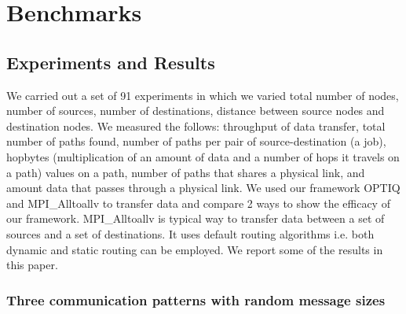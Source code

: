 \section{Benchmarks}
\label{sec:benchmark}







\subsection{Experiments and Results}

We carried out a set of 91 experiments in which we varied total number of nodes, number of sources, number of destinations, distance between source nodes and destination nodes. We measured the follows: throughput of data transfer, total number of paths found, number of paths per pair of source-destination (a job), hopbytes (multiplication of an amount of data and a number of hops it travels on a path) values on a path, number of paths that shares a physical link, and amount data that passes through a physical link. We used our framework OPTIQ and MPI\_Alltoallv to transfer data and compare 2 ways to show the efficacy of our framework. MPI\_Alltoallv is typical way to transfer data between a set of sources and a set of destinations. It uses default routing algorithms i.e. both dynamic and static routing can be employed. We report some of the results in this paper.



\subsubsection {Three communication patterns with random message sizes}

